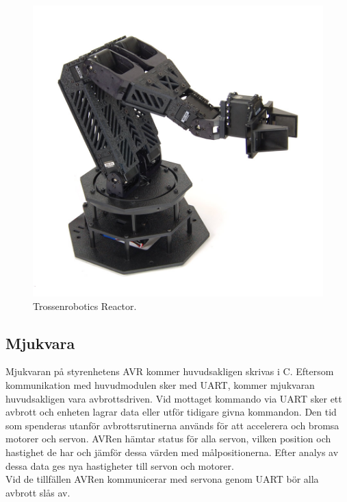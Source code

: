 \begin{figure}[h]
\center
\includegraphics[scale=0.35]{arm}
\caption{Trossenrobotics Reactor.}
\end{figure}

\subsection{Mjukvara}

Mjukvaran på styrenhetens AVR kommer huvudsakligen skrivas i C. Eftersom kommunikation med huvudmodulen sker med UART, kommer mjukvaran huvudsakligen vara avbrottsdriven. Vid mottaget kommando via UART sker ett avbrott och enheten lagrar data eller utför tidigare givna kommandon. Den tid som spenderas utanför avbrottsrutinerna används för att accelerera och bromsa motorer och servon. AVRen hämtar status för alla servon, vilken position och hastighet de har och jämför dessa värden med målpositionerna. Efter analys av dessa data ges nya hastigheter till servon och motorer. \\
Vid de tillfällen AVRen kommunicerar med servona genom UART bör alla avbrott slås av.  \\

